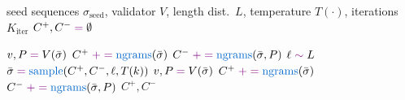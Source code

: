 \begin{algorithm}[h]
\caption{Adaptive contrastive $n$-gram training (Section~\ref{sub:n_gram}).}
\label{alg:ngram-training}
\small
\begin{algorithmic}[1]

\Require seed sequences $\mathcal{\sigma}_{\text{seed}}$, validator $V$, length dist.\ $L$, temperature $T(\cdot)$, iterations $K_{\text{iter}}$
\State $C^+, C^- \op{=} \emptyset$

 
    \State $v, P \op{=} V(\bar\sigma)$
        \State $C^+ \op{+=} \fn{ngrams}(\bar\sigma)$
    \Else
        \State $C^- \op{+=} \fn{ngrams}(\bar\sigma, P)$
    \EndIf
\EndFor
{} 
    \State $\ell \op{\sim} L$
    \State $\bar\sigma \op{=} \fn{sample}(C^+, C^-, \ell, T(k))$
     \State {} \EndIf
    \State $v, P \op{=} V(\bar\sigma)$
        \State $C^+ \op{+=} \fn{ngrams}(\bar\sigma)$
    \Else
        \State $C^- \op{+=} \fn{ngrams}(\bar\sigma, P)$
    \EndIf
\EndFor
\State {} $C^+, C^-$

\end{algorithmic}
\end{algorithm}
